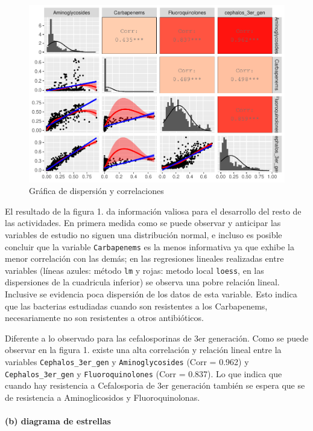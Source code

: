 \documentclass[
]{article}
\begin{document}
\begin{figure}
\centering
\includegraphics{1_actividad_analisis_general_files/figure-latex/Código para diagrama de dispresión y correlaciones-1.pdf}
\caption{Gráfica de dispersión y correlaciones}
\end{figure}

El resultado de la figura 1. da información valiosa para el desarrollo
del resto de las actividades. En primera medida como se puede observar y
anticipar las variables de estudio no siguen una distribución normal, e
incluso es posible concluir que la variable \texttt{Carbapenems} es la
menos informativa ya que exhibe la menor correlación con las demás; en
las regresiones lineales realizadas entre variables (líneas azules:
método \texttt{lm} y rojas: metodo local \texttt{loess}, en las
dispersiones de la cuadricula inferior) se observa una pobre relación
lineal. Inclusive se evidencia poca dispersión de los datos de esta
variable. Esto indica que las bacterias estudiadas cuando son
resistentes a los Carbapenems, necesariamente no son resistentes a otros
antibióticos.

Diferente a lo observado para las cefalosporinas de 3er generación. Como
se puede observar en la figura 1. existe una alta correlación y relación
lineal entre la variables \texttt{Cephalos\_3er\_gen} y
\texttt{Aminoglycosides} (Corr = 0.962) y \texttt{Cephalos\_3er\_gen} y
\texttt{Fluoroquinolones} (Corr = 0.837). Lo que indica que cuando hay
resistencia a Cefalosporia de 3er generación también se espera que se de
resistencia a Aminoglicosidos y Fluoroquinolonas.

\hypertarget{b-diagrama-de-estrellas}{%
\paragraph{(b) diagrama de estrellas}\label{b-diagrama-de-estrellas}}
\end{document}
